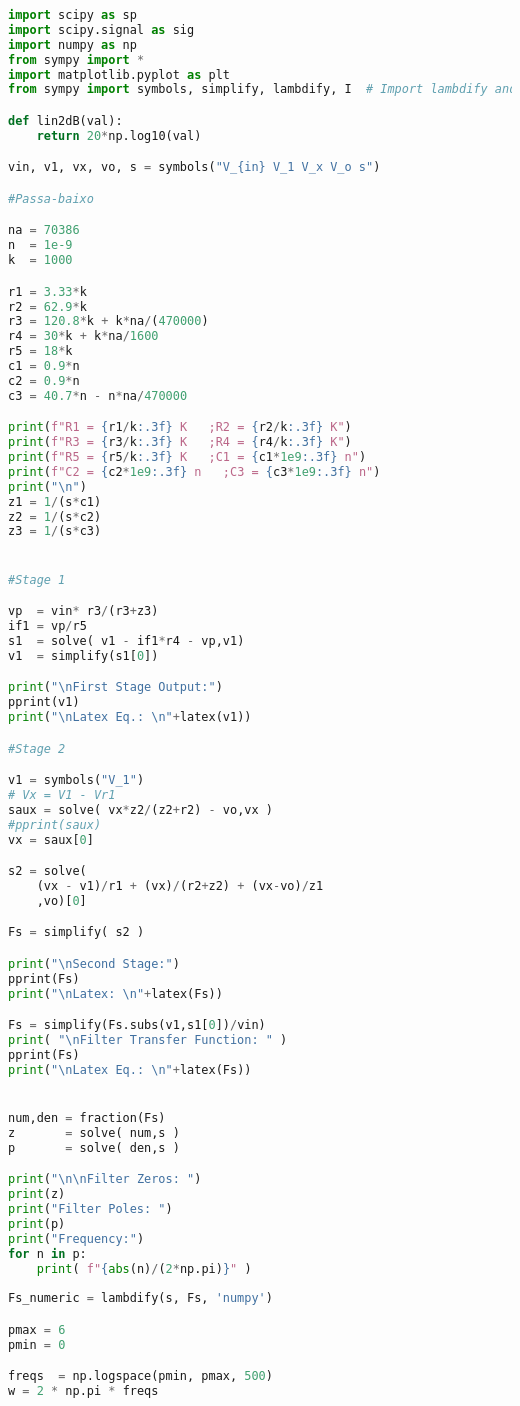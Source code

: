 \vspace{1cm}
\label{lst:ex2_script}
\begin{lstlisting}[language=python, caption = Specification Definition]
import scipy as sp 
import scipy.signal as sig
import numpy as np
from sympy import *
import matplotlib.pyplot as plt 
from sympy import symbols, simplify, lambdify, I  # Import lambdify and I (imaginary unit) from SymPy

def lin2dB(val):
    return 20*np.log10(val)

vin, v1, vx, vo, s = symbols("V_{in} V_1 V_x V_o s")

#Passa-baixo

na = 70386
n  = 1e-9
k  = 1000

r1 = 3.33*k
r2 = 62.9*k
r3 = 120.8*k + k*na/(470000) 
r4 = 30*k + k*na/1600
r5 = 18*k
c1 = 0.9*n
c2 = 0.9*n
c3 = 40.7*n - n*na/470000

print(f"R1 = {r1/k:.3f} K   ;R2 = {r2/k:.3f} K")
print(f"R3 = {r3/k:.3f} K   ;R4 = {r4/k:.3f} K")
print(f"R5 = {r5/k:.3f} K   ;C1 = {c1*1e9:.3f} n")
print(f"C2 = {c2*1e9:.3f} n   ;C3 = {c3*1e9:.3f} n")
print("\n")
z1 = 1/(s*c1)
z2 = 1/(s*c2)
z3 = 1/(s*c3)


#Stage 1

vp  = vin* r3/(r3+z3)
if1 = vp/r5
s1  = solve( v1 - if1*r4 - vp,v1)
v1  = simplify(s1[0])

print("\nFirst Stage Output:")
pprint(v1)
print("\nLatex Eq.: \n"+latex(v1))

#Stage 2

v1 = symbols("V_1")
# Vx = V1 - Vr1
saux = solve( vx*z2/(z2+r2) - vo,vx )
#pprint(saux)
vx = saux[0]

s2 = solve( 
    (vx - v1)/r1 + (vx)/(r2+z2) + (vx-vo)/z1
    ,vo)[0]

Fs = simplify( s2 )

print("\nSecond Stage:")
pprint(Fs)
print("\nLatex: \n"+latex(Fs))

Fs = simplify(Fs.subs(v1,s1[0])/vin)
print( "\nFilter Transfer Function: " )
pprint(Fs)
print("\nLatex Eq.: \n"+latex(Fs))


num,den = fraction(Fs)
z       = solve( num,s )
p       = solve( den,s )

print("\n\nFilter Zeros: ")
print(z)
print("Filter Poles: ")
print(p)
print("Frequency:")
for n in p:
    print( f"{abs(n)/(2*np.pi)}" )
 
Fs_numeric = lambdify(s, Fs, 'numpy')

pmax = 6
pmin = 0

freqs  = np.logspace(pmin, pmax, 500)
w = 2 * np.pi * freqs


\end{lstlisting}
